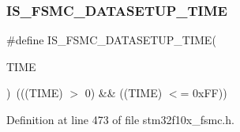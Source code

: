 \subsubsection{\texorpdfstring{I\+S\+\_\+\+F\+S\+M\+C\+\_\+\+D\+A\+T\+A\+S\+E\+T\+U\+P\+\_\+\+T\+I\+ME}{IS\_FSMC\_DATASETUP\_TIME}}
{\footnotesize\ttfamily \#define I\+S\+\_\+\+F\+S\+M\+C\+\_\+\+D\+A\+T\+A\+S\+E\+T\+U\+P\+\_\+\+T\+I\+ME(\begin{DoxyParamCaption}\item[{}]{T\+I\+ME }\end{DoxyParamCaption})~(((T\+I\+ME) $>$ 0) \&\& ((T\+I\+ME) $<$= 0x\+F\+F))}



Definition at line 473 of file stm32f10x\+\_\+fsmc.\+h.

